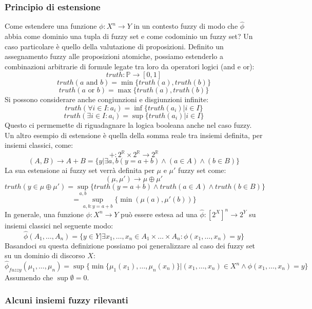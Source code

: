 \documentclass[10pt,a4paper]{article}
\begin{document}
\subsubsection{Principio di estensione}

Come estendere una funzione $\phi : X^n \to Y$ in un contesto fuzzy di modo che $\hat{\phi}$ abbia come dominio una tupla di fuzzy set e come codominio un fuzzy set? Un caso particolare è quello della valutazione di proposizioni. Definito un assegnamento fuzzy alle proposizioni atomiche, possiamo estenderlo a combinazioni arbitrarie di formule legate tra loro da operatori logici (and e or):
$$
truth: \mathbb{P} \to [0,1]
$$
$$
truth(a\text{ and }b) =  \min\{truth(a),truth(b)\}
$$
$$
truth(a\text{ or }b) =  \max\{truth(a),truth(b)\}
$$
Si possono considerare anche congiunzioni e disgiunzioni infinite:
$$
truth(\forall i \in I : a_i) = 	\inf \{ truth(a_i) | i \in I \}
$$
$$
truth(\exists i \in I : a_i) = 	\sup \{ truth(a_i) | i \in I \}
$$
Questo ci permemette di riguadagnare la logica booleana anche nel caso fuzzy. Un altro esempio di estensione è quella della somma reale tra insiemi definita, per insiemi classici, come:
$$
+ : 2^{\mathbb{R}} \times 2^{\mathbb{R}} \to 2^{\mathbb{R}}
$$
$$
(A,B) \to A + B = \{y | \exists a,b (y = a + b) \land (a \in A) \land (b \in B) \}
$$
La sua estensione ai fuzzy set verrà definita per $\mu$ e $\mu'$ fuzzy set come:
$$
(\mu,\mu') \to \mu \oplus \mu' 
$$
$$
truth(y \in \mu \oplus \mu') = \sup_{a,b}\{ truth(y = a + b) \land truth(a \in A) \land truth(b \in B)\}
$$
$$
= \sup_{a,b:y=a+b} \{ \min(\mu(a),\mu'(b)) \}
$$
In generale, una funzione $\phi : X^n \to Y$ può essere estesa ad una $\hat{\phi} : [2^X]^n \to 2^Y$ su insiemi classici nel seguente modo:
$$
\hat{\phi} (A_1, \dots, A_n) = \{ y \in Y | \exists x_1, \dots, x_n \in A_1 \times \dots \times A_n : \phi(x_1,\dots,x_n) = y \}
$$
Basandoci su questa definizione possiamo poi generalizzare al caso dei fuzzy set su un dominio di discorso $X$:
$$
\hat{\phi}_{fuzzy} (\mu_1, \dots, \mu_n) = \sup\{ \min \{ \mu_1(x_1), \dots, \mu_n(x_n) \} | (x_1, \dots, x_n) \in X^n \land \phi(x_1, \dots, x_n) = y \}
$$
Assumendo che $\sup \emptyset = 0$.

\subsubsection{Alcuni insiemi fuzzy rilevanti}
\end{document}

